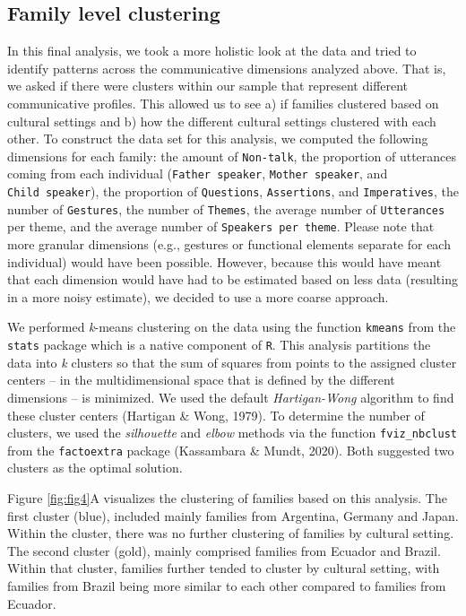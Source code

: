 \documentclass[
  man,floatsintext]{apa6}
\begin{document}
\hypertarget{family-level-clustering}{%
\subsection{Family level clustering}\label{family-level-clustering}}

In this final analysis, we took a more holistic look at the data and tried to identify patterns across the communicative dimensions analyzed above. That is, we asked if there were clusters within our sample that represent different communicative profiles. This allowed us to see a) if families clustered based on cultural settings and b) how the different cultural settings clustered with each other. To construct the data set for this analysis, we computed the following dimensions for each family: the amount of \texttt{Non-talk}, the proportion of utterances coming from each individual (\texttt{Father\ speaker}, \texttt{Mother\ speaker}, and \texttt{Child\ speaker}), the proportion of \texttt{Questions}, \texttt{Assertions}, and \texttt{Imperatives}, the number of \texttt{Gestures}, the number of \texttt{Themes}, the average number of \texttt{Utterances} per theme, and the average number of \texttt{Speakers\ per\ theme}. Please note that more granular dimensions (e.g., gestures or functional elements separate for each individual) would have been possible. However, because this would have meant that each dimension would have had to be estimated based on less data (resulting in a more noisy estimate), we decided to use a more coarse approach.

We performed \emph{k}-means clustering on the data using the function \texttt{kmeans} from the \texttt{stats} package which is a native component of \texttt{R}. This analysis partitions the data into \emph{k} clusters so that the sum of squares from points to the assigned cluster centers -- in the multidimensional space that is defined by the different dimensions -- is minimized. We used the default \emph{Hartigan-Wong} algorithm to find these cluster centers (Hartigan \& Wong, 1979). To determine the number of clusters, we used the \emph{silhouette} and \emph{elbow} methods via the function \texttt{fviz\_nbclust} from the \texttt{factoextra} package (Kassambara \& Mundt, 2020). Both suggested two clusters as the optimal solution.

Figure \ref{fig:fig4}A visualizes the clustering of families based on this analysis. The first cluster (blue), included mainly families from Argentina, Germany and Japan. Within the cluster, there was no further clustering of families by cultural setting. The second cluster (gold), mainly comprised families from Ecuador and Brazil. Within that cluster, families further tended to cluster by cultural setting, with families from Brazil being more similar to each other compared to families from Ecuador.
\end{document}
